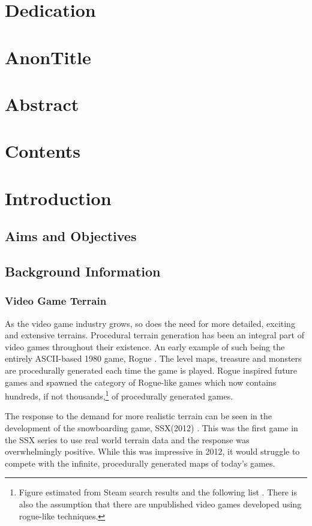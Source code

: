 \documentclass[a4paper]{report}
\begin{document}

\section{Dedication}
\section{AnonTitle}
\section{Abstract}
\section{Contents}
\section{Introduction}
\subsection{Aims and Objectives}
\subsection{Background Information}
\subsubsection{Video Game Terrain}
As the video game industry grows, so does the need for more detailed, exciting and extensive terrains. Procedural terrain generation has been an integral part of video games throughout their existence. An early example of such being the entirely ASCII-based 1980 game, Rogue \cite{rogue}. The level maps, treasure and monsters are procedurally generated each time the game is played. Rogue inspired future games and spawned the category of Rogue-like games which now contains hundreds, if not thousands,\footnote{Figure estimated from Steam search results \cite{roguelikeSteam} and the following list \cite{roguebasin_2020}. There is also the assumption that there are unpublished video games developed using rogue-like techniques.} of procedurally generated games.

The response to the demand for more realistic terrain can be seen in the development of the snowboarding game, SSX(2012) \cite{SSX}. This was the first game in the SSX series to use real world terrain data and the response was overwhelmingly positive. While this was impressive in 2012, it would struggle to compete with the infinite, procedurally generated maps of today's games.
\end{document}
